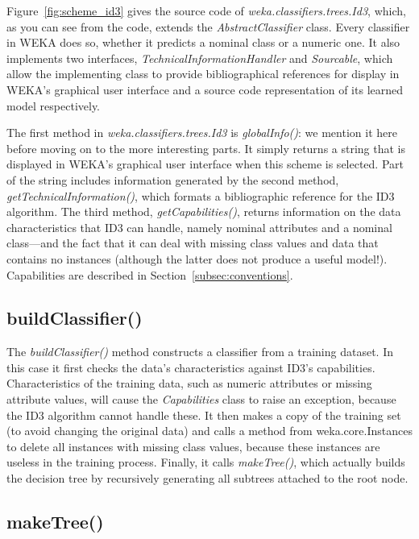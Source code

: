 Figure~\ref{fig:scheme_id3} gives the source code
of \textit{weka.classifiers.trees.Id3}, which, as you can see from the
code, extends the \textit{AbstractClassifier} class. Every classifier
in WEKA does so, whether it predicts a nominal class or a numeric
one. It also implements two
interfaces, \textit{TechnicalInformationHandler}
and \textit{Sourcable}, which allow the implementing class to provide
bibliographical references for display in WEKA's graphical user
interface and a source code representation of its learned model
respectively.

The first method in \textit{weka.classifiers.trees.Id3}
is \textit{globalInfo()}: we mention it here before moving on to the
more interesting parts. It simply returns a string that is displayed
in WEKA's graphical user interface when this scheme is selected. Part
of the string includes information generated by the second method,
\textit{getTechnicalInformation()}, which formats a bibliographic reference for
the ID3 algorithm. The third
method, \textit{getCapabilities()}, returns information on the data
characteristics that ID3 can handle, namely nominal
attributes and a nominal class---and the fact that it can deal with
missing class values and data that contains no instances (although the
latter does not produce a useful model!). Capabilities are described
in Section~\ref{subsec:conventions}.

\subsection{buildClassifier()}

The \textit{buildClassifier()} method constructs a classifier from a
training dataset. In this case it first checks the data's
characteristics against ID3's capabilities. Characteristics of the
training data, such as numeric attributes or missing attribute values,
will cause the \textit{Capabilities} class to raise an exception,
because the ID3 algorithm cannot handle these. It then makes a copy of
the training set (to avoid changing the original data) and calls a
method from weka.core.Instances to delete all instances with missing
class values, because these instances are useless in the training
process. Finally, it calls \textit{makeTree()}, which actually builds
the decision tree by recursively generating all subtrees attached to
the root node.

\subsection{makeTree()}

